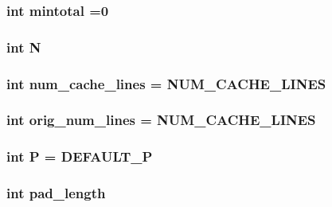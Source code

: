 \subsubsection[{mintotal}]{\setlength{\rightskip}{0pt plus 5cm}int mintotal =0}\label{fft_8C_ae4ea09b43e337f76159fd601ec785bcf}
\hypertarget{fft_8C_a7722c8ecbb62d99aee7ce68b1752f337}{}
\subsubsection[{N}]{\setlength{\rightskip}{0pt plus 5cm}int N}\label{fft_8C_a7722c8ecbb62d99aee7ce68b1752f337}
\hypertarget{fft_8C_aef98a866941663b863e741a502880efc}{}
\subsubsection[{num\+\_\+cache\+\_\+lines}]{\setlength{\rightskip}{0pt plus 5cm}int num\+\_\+cache\+\_\+lines = {\bf N\+U\+M\+\_\+\+C\+A\+C\+H\+E\+\_\+\+L\+I\+N\+E\+S}}\label{fft_8C_aef98a866941663b863e741a502880efc}
\hypertarget{fft_8C_ae058fc3d0cfa8f930eb88082726ccf56}{}
\subsubsection[{orig\+\_\+num\+\_\+lines}]{\setlength{\rightskip}{0pt plus 5cm}int orig\+\_\+num\+\_\+lines = {\bf N\+U\+M\+\_\+\+C\+A\+C\+H\+E\+\_\+\+L\+I\+N\+E\+S}}\label{fft_8C_ae058fc3d0cfa8f930eb88082726ccf56}
\hypertarget{fft_8C_aef94be98e2c9e4a4dece75f60ca9792c}{}
\subsubsection[{P}]{\setlength{\rightskip}{0pt plus 5cm}int P = {\bf D\+E\+F\+A\+U\+L\+T\+\_\+\+P}}\label{fft_8C_aef94be98e2c9e4a4dece75f60ca9792c}
\hypertarget{fft_8C_a3d0e20892ce2302560522400f5b5da17}{}
\subsubsection[{pad\+\_\+length}]{\setlength{\rightskip}{0pt plus 5cm}int pad\+\_\+length}\label{fft_8C_a3d0e20892ce2302560522400f5b5da17}
\hypertarget{fft_8C_a54af42a3fc75a72bd07ecc71cee6f5ba}{}
